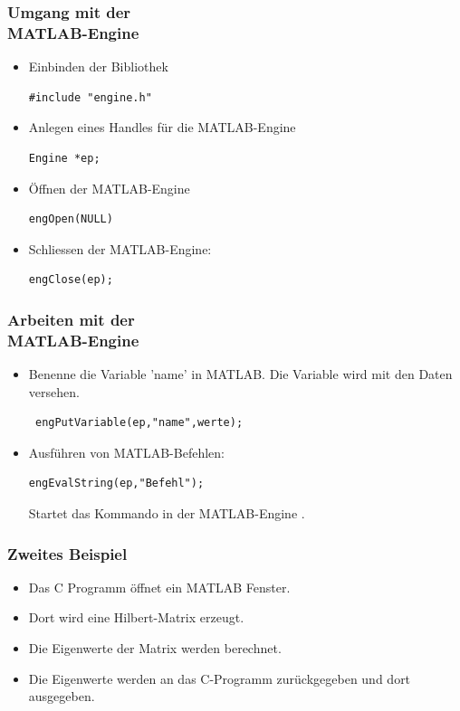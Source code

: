 \begin{frame}[fragile]\frametitle{Umgang mit der \\ MATLAB-Engine}
\vspace*{0.5cm}
\begin{itemize}
\item Einbinden der Bibliothek 
\begin{lstlisting}
#include "engine.h"
\end{lstlisting}
\item Anlegen eines Handles f\"ur die MATLAB-Engine
\begin{lstlisting}
Engine *ep;
\end{lstlisting}
\item \"Offnen der MATLAB-Engine
\begin{lstlisting}
engOpen(NULL) 
\end{lstlisting} 
\item Schliessen der MATLAB-Engine: 
\begin{lstlisting}
engClose(ep);
\end{lstlisting}
\end{itemize}
\end{frame}
%
%
\begin{frame}[fragile]\frametitle{Arbeiten mit der \\MATLAB-Engine}
\vspace*{0.5cm}
\begin{itemize}
\item  Benenne die Variable 'name' in MATLAB. Die Variable wird mit den Daten
 versehen. 
\begin{lstlisting}
 engPutVariable(ep,"name",werte);
\end{lstlisting}
\item Ausf\"uhren von MATLAB-Befehlen:
\begin{lstlisting}
engEvalString(ep,"Befehl");
\end{lstlisting}
Startet das Kommando  in der MATLAB-Engine .
\end{itemize}
\end{frame}
%
%
\begin{frame}[fragile]\frametitle{Zweites Beispiel}
\begin{itemize}
\item Das C Programm \"offnet ein MATLAB Fenster.
\item Dort wird eine Hilbert-Matrix erzeugt.
\item Die Eigenwerte der Matrix werden berechnet.
\item Die Eigenwerte werden an das C-Programm zur\"uckgegeben und dort
  ausgegeben. 
\end{itemize}
\end{frame}

